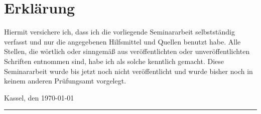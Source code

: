 \chapter*{Erklärung}

\vfill

Hiermit versichere ich, dass ich die vorliegende Seminararbeit selbstständig
verfasst und nur die angegebenen Hilfsmittel und Quellen benutzt habe. Alle
Stellen, die wörtlich oder sinngemäß aus veröffentlichten oder
unveröffentlichten Schriften entnommen sind, habe ich als solche kenntlich
gemacht. Diese Seminararbeit wurde bis jetzt noch nicht veröffentlicht und
wurde bisher noch in keinem anderen Prüfungsamt vorgelegt.
\newline
\newline

\qquad Kassel, den \today \hfill
\rule{0.45\textwidth}{0.4pt}

\vfill 
